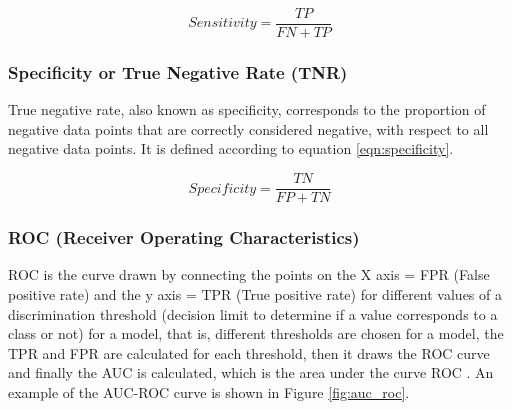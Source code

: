 \begin{equation}
Sensitivity = \frac{TP}{FN+TP}
\label{eqn:sensibility}
\end{equation}

\subsubsection{Specificity or True Negative Rate (TNR) }

True negative rate, also known as specificity, corresponds to the proportion of negative data points that are correctly considered negative, with respect to all negative data points. It is defined according to equation \ref{eqn:specificity}.

\begin{equation}
Specificity = \frac{TN}{FP+TN}
\label{eqn:specificity}
\end{equation}

\subsubsection{ROC (Receiver Operating Characteristics)}

ROC is the curve drawn by connecting the points on the X axis = FPR (False positive rate) and the y axis = TPR (True positive rate) for different values of a discrimination threshold (decision limit to determine if a value corresponds to a class or not) for a model, that is, different thresholds are chosen for a model, the TPR and FPR are calculated for each threshold, then it draws the ROC curve and finally the AUC is calculated, which is the area under the curve ROC . An example of the AUC-ROC curve is shown in Figure \ref{fig:auc_roc}.

